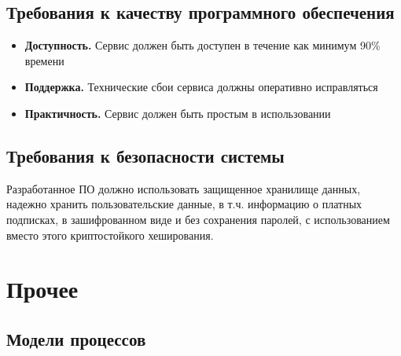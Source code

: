 \subsection{Требования к качеству программного обеспечения}
\begin{itemize}
    \item \textbf{Доступность.} Сервис должен быть доступен в течение как минимум 90\% времени
    \item \textbf{Поддержка.} Технические сбои сервиса должны оперативно исправляться
    \item \textbf{Практичность.} Сервис должен быть простым в использовании
\end{itemize}

\subsection{Требования к безопасности системы}
Разработанное ПО должно использовать защищенное хранилище данных,
надежно хранить пользовательские данные, в т.ч. информацию о платных подписках,
в зашифрованном виде и без сохранения паролей,
с использованием вместо этого криптостойкого хеширования.

\section{Прочее}
\subsection{Модели процессов}
